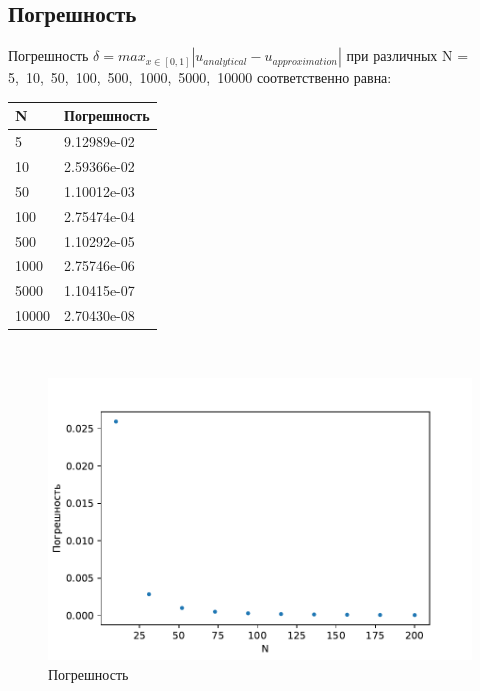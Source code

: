 \documentclass[12pt, a4paper]{article}
\begin{document}
\begin{figure}[h]
\begin{minipage}[h]{0.47\linewidth}
		\end{minipage}
	\end{figure}
	\vspace{0.5cm}
	\newpage
	
	\subsection{Погрешность}
	\vspace{0.5cm}
	Погрешность $\delta = max_{x \in [0,1]} |u_{analytical} - u_{approximation}|$ 
	при различных N = 5,\ 10,\ 50,\ 100,\ 500,\ 1000,\ 5000,\ 10000 
	соответственно равна:\\
	\begin{table}[h]
	\centering
		\begin{tabular}{ll}
		\hline
		N & Погрешность \\
		\hline
		5 & 9.12989e-02\\
		10 & 2.59366e-02\\
		50 & 1.10012e-03\\
		100 & 2.75474e-04\\
		500 & 1.10292e-05\\
		1000 & 2.75746e-06\\
		5000 & 1.10415e-07\\
		10000 & 2.70430e-08\\
		\hline
		\end{tabular}
	\end{table}\\
	\begin{figure}[h]
		\includegraphics{norm}
		\caption{Погрешность}
	\end{figure}
\end{document}
